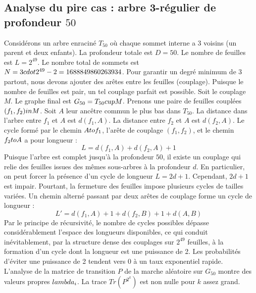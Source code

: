 \documentclass[12pt,a4paper]{article}
\begin{document}
\subsection{Analyse du pire cas : arbre 3-r\'egulier de profondeur $50$}
Consid\'erons un arbre enracin\'e $T_{50}$ o\`u chaque sommet interne a 3 voisins (un parent et deux enfants).
La profondeur totale est $D = 50$.
Le nombre de feuilles est $L = 2^{49}$.
Le nombre total de sommets est $N = 3 \\cdot 2^{49} - 2 = 1688849860263934$.
Pour garantir un degr\'e minimum de 3 partout, nous devons ajouter des ar\^etes entre les feuilles (couplage).
Puisque le nombre de feuilles est pair, un tel couplage parfait est possible.
Soit le couplage $M$. Le graphe final est $G_{50} = T_{50} \\cup M$.
Prenons une paire de feuilles coupl\'ees $(f_1, f_2) \\in M$.
Soit $A$ leur anc\^etre commun le plus bas dans $T_{50}$.
La distance dans l'arbre entre $f_1$ et $A$ est $d(f_1, A)$.
La distance entre $f_2$ et $A$ est $d(f_2, A)$.
Le cycle form\'e par le chemin $A \\to f_1$, l'ar\^ete de couplage $(f_1, f_2)$, et le chemin $f_2 \\to A$ a pour longueur :
$$ L = d(f_1, A) + d(f_2, A) + 1 $$
Puisque l'arbre est complet jusqu'\`a la profondeur $50$, il existe un couplage qui relie des feuilles issues des m\^emes sous-arbres \`a la profondeur $d$.
En particulier, on peut forcer la pr\'esence d'un cycle de longueur $L = 2d + 1$. Cependant, $2d+1$ est impair.
Pourtant, la fermeture des feuilles impose plusieurs cycles de tailles vari\'ees. Un chemin altern\'e passant par deux ar\^etes de couplage forme un cycle de longueur :
$$ L' = d(f_1, A) + 1 + d(f_2, B) + 1 + d(A, B) $$
Par le principe de r\'ecursivit\'e, le nombre de cycles possibles d\'epasse consid\'erablement l'espace des longueurs disponibles, ce qui conduit in\'evitablement, par la structure dense des couplages sur $2^{49}$ feuilles, \`a la formation d'un cycle dont la longueur est une puissance de 2. Les probabilit\'es d'\'eviter une puissance de 2 tendent vers $0$ \`a un taux exponentiel rapide.
L'analyse de la matrice de transition $P$ de la marche al\'eatoire sur $G_{50}$ montre des valeurs propres $\\lambda_i$. La trace $Tr(P^{2^k})$ est non nulle pour $k$ assez grand.
\end{document}
